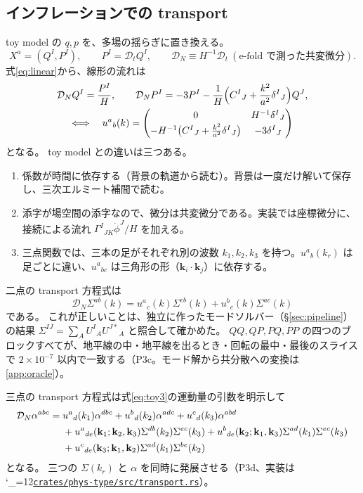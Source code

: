 \documentclass[a4paper,11pt]{ltjsarticle}
\newcommand{\Dt}{\mathcal{D}_t}
\newcommand{\DN}{\mathcal{D}_N}
\newcommand{\repourl}{https://github.com/inuverse44/phys-type-dev}
\newcommand{\reporev}{b1fea87}
\newcommand{\repo}{\begingroup\catcode`\_=12\relax\repoaux}
\newcommand{\repoaux}[1]{\href{\repourl/blob/\reporev/#1}{\nolinkurl{#1}}\endgroup}
\begin{document}
\subsection{インフレーションでの transport}

toy model の $q,p$ を、多場の揺らぎに置き換える。
\[
X^a=(Q^I,P^I),\qquad P^I=\Dt Q^I,\qquad \DN\equiv H^{-1}\Dt\ (\text{e-fold で測った共変微分}).
\]
式\eqref{eq:linear}から、線形の流れは
\begin{gather}
\DN Q^I=\frac{P^I}{H},\qquad \DN P^I=-3P^I-\frac{1}{H}\Big(C^I{}_J+\frac{k^2}{a^2}\delta^I{}_J\Big)Q^J,
\notag\\
\Longleftrightarrow\quad
u^a{}_b(k)=\begin{pmatrix}0&H^{-1}\delta^I{}_J\\[2pt]-H^{-1}\big(C^I{}_J+\frac{k^2}{a^2}\delta^I{}_J\big)&-3\delta^I{}_J\end{pmatrix}
\label{eq:u}
\end{gather}
となる。
toy model との違いは三つある。
\begin{enumerate}
\item 係数が時間に依存する（背景の軌道から読む）。背景は一度だけ解いて保存し、三次エルミート補間で読む。
\item 添字が場空間の添字なので、微分は共変微分である。実装では座標微分に、接続による流れ $\Gamma^I{}_{JK}\dot\phi^J/H$ を加える。
\item 三点関数では、三本の足がそれぞれ別の波数 $k_1,k_2,k_3$ を持つ。$u^a{}_b(k_r)$ は足ごとに違い、$u^a{}_{bc}$ は三角形の形（$\mathbf k_i\cdot\mathbf k_j$）に依存する。
\end{enumerate}

二点の transport 方程式は
\[
\DN\Sigma^{ab}(k)=u^a{}_c(k)\Sigma^{cb}(k)+u^b{}_c(k)\Sigma^{ac}(k)
\]
である。
これが正しいことは、独立に作ったモードソルバー（\S\ref{sec:pipeline}）の結果 $\Sigma^{IJ}=\sum_AU^I{}_AU^{J*}{}_A$ と照合して確かめた。
$QQ,QP,PQ,PP$ の四つのブロックすべてが、地平線の中・地平線を出るとき・回転の最中・最後のスライスで $2\times10^{-7}$ 以内で一致する（P3c。モード解から共分散への変換は\ref{app:oracle}）。

三点の transport 方程式は式\eqref{eq:toy3}の運動量の引数を明示して
\begin{align}
\DN\alpha^{abc}={}&u^a{}_d(k_1)\alpha^{dbc}+u^b{}_d(k_2)\alpha^{adc}+u^c{}_d(k_3)\alpha^{abd}\notag\\
&+u^a{}_{de}(\mathbf k_1;\mathbf k_2,\mathbf k_3)\Sigma^{db}(k_2)\Sigma^{ec}(k_3)
+u^b{}_{de}(\mathbf k_2;\mathbf k_1,\mathbf k_3)\Sigma^{ad}(k_1)\Sigma^{ec}(k_3)\notag\\
&+u^c{}_{de}(\mathbf k_3;\mathbf k_1,\mathbf k_2)\Sigma^{ad}(k_1)\Sigma^{be}(k_2)
\end{align}
となる。
三つの $\Sigma(k_r)$ と $\alpha$ を同時に発展させる（P3d、実装は \repo{crates/phys-type/src/transport.rs}）。
\end{document}
